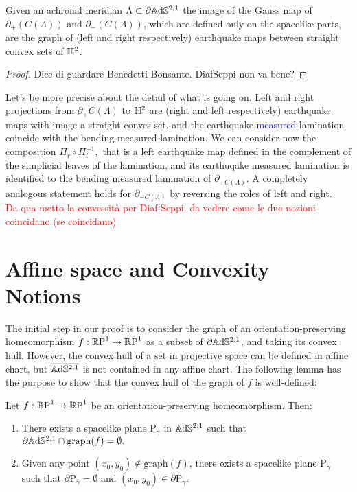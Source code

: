 \begin{lemma}
    Given an achronal meridian $\Lambda\subset\partial\mathbb{A}\mathrm{d}\mathbb{S}^{2,1}$ the image of the Gauss map of $\partial_+(C(\Lambda))$ and $\partial_-(C(\Lambda))$, which are defined only on the spacelike parts, are the graph of (left and right respectively) earthquake maps between straight convex sets of $\mathbb{H}^2$.
\end{lemma}
\begin{proof}
    Dice di guardare Benedetti-Bonsante. DiafSeppi non va bene?
\end{proof}

Let's be more precise about the detail of what is going on. Left and right projections from $\partial_+C(\Lambda)$ to $\mathbb{H}^2$ are (right and left respectively) earthquake maps with image a straight conves set, and the earthquake \textcolor{blue}{measured} lamination coincide with the bending measured lamination. We can consider now the composition $\Pi_r\circ\Pi_l^{-1},$ that is a left earthquake map defined in the complement of the simplicial leaves of the lamination, and its earthuqake measured lamination is identified to the bending measured lamination of $\partial_{+C(\Lambda)}$. A completely analogous statement holds for $\partial_{-C(\Lambda)}$ by reversing the roles of left and right.\\  

\textcolor{red}{Da qua metto la convessità per Diaf-Seppi, da vedere come le due nozioni coincidano (se coincidano)}
\section{Affine space and Convexity Notions}
The initial step in our proof is to consider the graph of an orientation-preserving homeomorphism $f:\mathbb{R}\text{P}^1\to\mathbb{R}\text{P}^1$ as a subset of $\partial\mathbb{A}\mathrm{d}\mathbb{S}^{2,1}$, and taking its convex hull. However, the convex hull of a set in projective space can be defined in affine chart, but $\overline{\mathbb{A}\mathrm{d}\mathbb{S}^{2,1}}$ is not contained in any affine chart. The following lemma has the purpose to show that the convex hull of the graph of $f$ is well-defined: 
\begin{lemma}\label{bdconvex}
    Let $f:\mathbb{R}\text{P}^1\to\mathbb{R}\text{P}^1$ be an orientation-preserving homeomorphism. Then: 
    \begin{enumerate}
        \item There exists a spacelike plane $\text{P}_\gamma$ in $\mathbb{A}\mathrm{d}\mathbb{S}^{2,1}$ such that $\partial\mathbb{A}\mathrm{d}\mathbb{S}^{2,1}\cap\text{graph}(f)=\emptyset.$
        \item Given any point $(x_0,y_0)\notin\text{graph}(f)$, there exists a spacelike plane $\text{P}_\gamma$ such that $\partial\text{P}_\gamma=\emptyset$ and $(x_0,y_0)\in\partial\text{P}_\gamma.$ 
    \end{enumerate}
\end{lemma}

